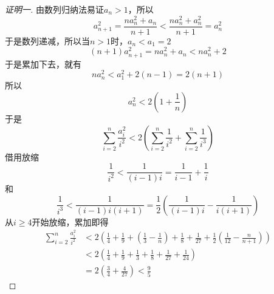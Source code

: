 \exerciseFrom[\url{http://kuing.orzweb.net/viewthread.php?tid=4542}]

\exerciseSolvedDate[2017-04-09]

\begin{proof}[证明一]
  由数列归纳法易证$a_n>1$，所以
\[ a_{n+1}^2=\frac{na_n^2+a_n}{n+1} < \frac{na_n^2+a_n^2}{n+1} = a_n^2 \]
于是数列递减，所以当$n>1$时，$a_n < a_1=2$
\[ (n+1)a_{n+1}^2 = na_n^2+a_n < na_n^2+2\]
于是累加下去，就有
\[ na_n^2 < a_1^2+2(n-1)=2(n+1) \]
所以
\[ a_n^2 < 2 \left( 1+\frac{1}{n} \right) \]
于是
\[ \sum_{i=2}^n \frac{a_i^2}{i^2} <2 \left( \sum_{i=2}^n \frac{1}{i^2}+\sum_{i=2}^n \frac{1}{i^3} \right) \]
借用放缩
\[ \frac{1}{i^2}<\frac{1}{(i-1)i}=\frac{1}{i-1}+\frac{1}{i} \]
和
\[ \frac{1}{i^3}<\frac{1}{(i-1)i(i+1)} = \frac{1}{2} \left( \frac{1}{(i-1)i}-\frac{1}{i(i+1)} \right) \]
从$i \geqslant 4$开始放缩，累加即得
\begin{align*}
\sum_{i=2}^n \frac{a_i^2}{i^2} & < 2 \left( \frac{1}{4}+\frac{1}{9}+(\frac{1}{3}-\frac{1}{n})+\frac{1}{8}+\frac{1}{27}+\frac{1}{2}(\frac{1}{12}-\frac{n}{n+1}) \right) \\
& < 2 \left( \frac{1}{4}+\frac{1}{9}+\frac{1}{3}+\frac{1}{8}+\frac{1}{27}+\frac{1}{24} \right) \\
& = 2 \left( \frac{3}{4}+\frac{4}{27} \right)<\frac{9}{5}
\end{align*}
\end{proof}

